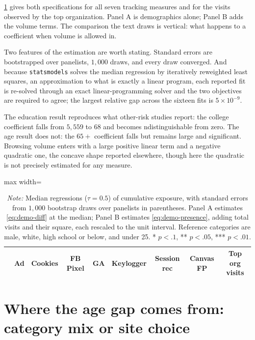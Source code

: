 \documentclass[12pt, letterpaper]{article}
\begin{document}
\cref{tab:presence_adjusted_median} gives both specifications for all seven tracking measures and for the visits observed by the top organization.
Panel A is demographics alone; Panel B adds the volume terms. The comparison the text draws is vertical: what happens to a coefficient when volume is allowed in.
 
Two features of the estimation are worth stating. Standard errors are bootstrapped over panelists, $1{,}000$ draws, and every draw converged.
And because \texttt{statsmodels} solves the median regression by iteratively reweighted least squares, an approximation to what is exactly a linear program, each reported fit is re-solved through an exact linear-programming solver and the two objectives are required to agree; the largest relative gap across the sixteen fits is $5 \times 10^{-9}$.
 
The education result reproduces what other-risk studies report: the college coefficient falls from $5{,}559$ to $68$ and becomes  ndistinguishable from zero. The age result does not: the $65+$ coefficient falls but remains large and significant. Browsing volume enters with a large positive linear term and a negative quadratic one, the concave shape reported elsewhere, though here the quadratic is not precisely estimated for any measure.

\begin{table}[ht]
\centering
\caption{Demographic differences in cumulative exposure, before and after adjusting for browsing volume}
\label{tab:presence_adjusted_median}
\begin{adjustbox}{max width=\textwidth}
\begin{tabular}{lcccccccc}
\toprule
& Ad & Cookies & FB Pixel & GA & Keylogger & Session rec & Canvas FP & Top org visits \\
\midrule

\bottomrule
\end{tabular}
\end{adjustbox}
\caption*{\textit{Note:} Median regressions ($\tau = 0.5$) of cumulative exposure,
with standard errors from $1{,}000$ bootstrap draws over panelists in parentheses.
Panel A estimates \cref{eq:demo-diff} at the median; Panel B estimates
\cref{eq:demo-presence}, adding total visits and their square, each rescaled to the
unit interval. Reference categories are male, white, high school or below, and under
25. * $p<.1$, ** $p<.05$, *** $p<.01$.}
\end{table}

\section{Where the age gap comes from: category mix or site choice}
\label{sm:decomposition}
 
\end{document}
